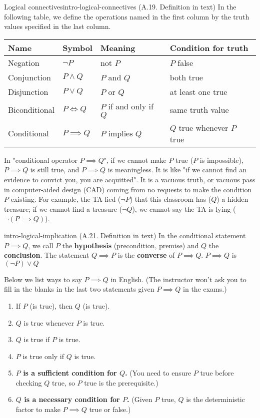 \documentclass[../src/handouts/main.tex]{subfiles}
\begin{document}
\begin{definition}{Logical connectives}{intro-logical-connectives}
  (A.19. Definition in text)
  In the following table, we define the operations named in the first column by the truth values specified in the last column.

  \centering
  \begin{tabular}{l|lll}
    Name          & Symbol         & Meaning                & Condition for truth        \\ \hline
    Negation      & $\neg P$       & not $P$                & $P$ false                  \\
    Conjunction   & $P \wedge Q$   & $P$ and $Q$            & both true                  \\
    Disjunction   & $P \vee Q$     & $P$ or $Q$             & at least one true          \\
    Biconditional & $P \iff Q$     & $P$ if and only if $Q$ & same truth value           \\
    Conditional   & $P \implies Q$ & $P$ implies $Q$        & $Q$ true whenever $P$ true
  \end{tabular}
\end{definition}

In "conditional operator $P \implies Q$", if we cannot make $P$ true ($P$ is impossible), $P \implies Q$ is still true, and $P \implies Q$ is meaningless. It is like "if we cannot find an evidence to convict you, you are acquitted". It is a vacuous truth, or vacuous pass in computer-aided design (CAD) coming from no requests to make the condition $P$ existing. For example, the TA lied ($\neg P$) that this classroom has ($Q$) a hidden treasure; if we cannot find a treasure ($\neg Q$), we cannot say the TA is lying ($\neg \left( P \implies Q \right)$).

\begin{definition}{}{intro-logical-implication}
  (A.21. Definition in text) In the conditional statement $P \implies Q$, we call $P$ the \textbf{hypothesis} (precondition, premise) and $Q$ the \textbf{conclusion}. The statement $Q \implies P$ is the \textbf{converse} of $P \implies Q$. $P \implies Q$ is $(\neg P) \lor Q$

  Below we list ways to say $P \implies Q$ in English. (The instructor won't ask you to fill in the blanks in the last two statements given $P \implies Q$ in the exams.)
  \begin{enumerate}
    \item If $P$ (is true), then $Q$ (is true).
    \item $Q$ is true whenever $P$ is true.
    \item $Q$ is true if $P$ is true.
    \item $P$ is true only if $Q$ is true.
    \item \textbf{$P$ is a sufficient condition for $Q$.} (You need to ensure $P$ true before checking $Q$ true, so $P$ true is the prerequisite.)
    \item \textbf{$Q$ is a necessary condition for $P$.} (Given $P$ true, $Q$ is the deterministic factor to make $P \implies Q$ true or false.)
  \end{enumerate}
\end{definition}
\end{document}
